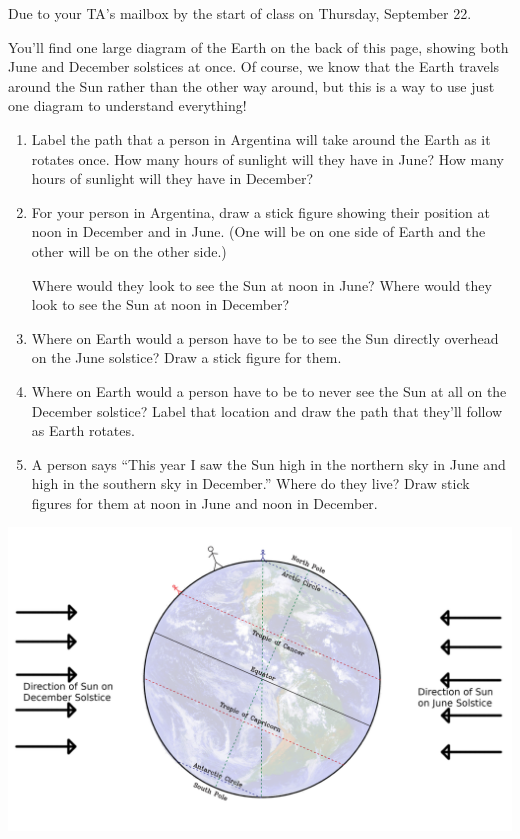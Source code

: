 \documentclass[12pt]{article}
\begin{document}
\newpage

\Large
\centerline{}
\it \begin{center} \normalsize Due to your TA's mailbox by the start of class on Thursday, September 22.\end{center}
\normalsize
\rm

You'll find one large diagram of the Earth on the back of this page, showing both June and December solstices at once. Of course, we know that the Earth travels around the Sun rather than the other way around, but this is a way to use just one diagram to understand everything!

\begin{enumerate}
	\item Label the path that a person in Argentina will take around the Earth as it rotates once. How many hours of sunlight will they have in June? How many hours of sunlight will they have in December?
	
	\vspace{1in}
	
	\item For your person in Argentina, draw a stick figure showing their position at noon in December and in June. (One will be on one side of Earth and the other will be on the other side.)
	
	Where would they look to see the Sun at noon in June? Where would they look to see the Sun at noon in December?
	\vspace{0.8in}	

	\item Where on Earth would a person have to be to see the Sun directly overhead on the June solstice? Draw a stick figure for them.
	\vspace{0.8in}	
	
	\item Where on Earth would a person have to be to never see the Sun at all on the December solstice? Label that location and draw the path that they'll follow as Earth rotates.
		\vspace{0.8in}
		
	\item A person says ``This year I saw the Sun high in the northern sky in June and high in the southern sky in December.'' Where do they live? Draw stick figures for them at noon in June and noon in December.
	
\end{enumerate}

\newpage
\begin{landscape}
	\vspace{1in}
	
	\includegraphics[width=10in]{earth-diagram-both.png}
\end{landscape}

	
\end{document}
